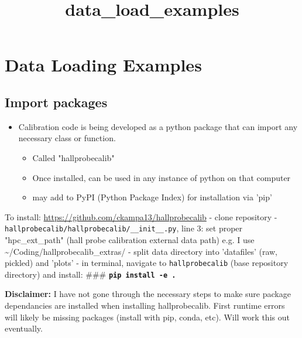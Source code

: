 \documentclass[11pt]{article}
\title{data\_load\_examples}
\providecommand{\tightlist}{%
      \setlength{\itemsep}{0pt}\setlength{\parskip}{0pt}}
\begin{document}
    
    
    \maketitle
    
    

    
    \section{Data Loading Examples}\label{data-loading-examples}

\subsection{Import packages}\label{import-packages}

\begin{itemize}
\tightlist
\item
  Calibration code is being developed as a python package that can
  import any necessary class or function.

  \begin{itemize}
  \tightlist
  \item
    Called "hallprobecalib"
  \item
    Once installed, can be used in any instance of python on that
    computer
  \item
    may add to PyPI (Python Package Index) for installation via 'pip'
  \end{itemize}
\end{itemize}

To install: \url{https://github.com/ckampa13/hallprobecalib} - clone
repository - \texttt{hallprobecalib/hallprobecalib/\_\_init\_\_.py},
line 3: set proper "hpc\_ext\_path" (hall probe calibration external
data path) e.g. I use \textasciitilde{}/Coding/hallprobecalib\_extras/ -
split data directory into 'datafiles' (raw, pickled) and 'plots' - in
terminal, navigate to \texttt{hallprobecalib} (base repository
directory) and install: \#\#\# \textbf{\texttt{pip\ install\ -e\ .}}

\textbf{Disclaimer:} I have not gone through the necessary steps to make
sure package dependancies are installed when installing hallprobecalib.
First runtime errors will likely be missing packages (install with pip,
conda, etc). Will work this out eventually.
\end{document}
